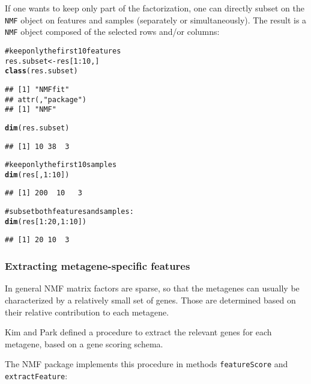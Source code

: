 \documentclass[a4paper]{article}\usepackage{graphicx, color}
\makeatletter
\newcommand{\hlfunctioncall}[1]{\textcolor[rgb]{0.501960784313725,0,0.329411764705882}{\textbf{#1}}}%
\newcommand{\hlcomment}[1]{\textcolor[rgb]{0.180392156862745,0.6,0.341176470588235}{#1}}%
\newenvironment{kframe}{%
 \def\at@end@of@kframe{}%
 \ifinner\ifhmode%
  \def\at@end@of@kframe{\end{minipage}}%
  \begin{minipage}{\columnwidth}%
 \fi\fi%
 \def\FrameCommand##1{\hskip\@totalleftmargin \hskip-\fboxsep
 \colorbox{shadecolor}{##1}\hskip-\fboxsep
     \hskip-\linewidth \hskip-\@totalleftmargin \hskip\columnwidth}%
 \MakeFramed {\advance\hsize-\width
   \@totalleftmargin\z@ \linewidth\hsize
   \@setminipage}}%
 {\par\unskip\endMakeFramed%
 \at@end@of@kframe}
\newenvironment{knitrout}{}{} %
\let\code=\texttt
\renewcommand{\cite}[1]{\parencite{#1}}
\makeatother
\begin{document}
If one wants to keep only part of the factorization, one can directly subset on the \code{NMF} object on features and samples (separately or simultaneously).
The result is a \code{NMF} object composed of the selected rows and/or columns:
\begin{knitrout}
\color{fgcolor}\begin{kframe}
\begin{alltt}
\hlcomment{# keep only the first 10 features}
res.subset <- res[1:10, ]
\hlfunctioncall{class}(res.subset)
\end{alltt}
\begin{verbatim}
## [1] "NMFfit"
## attr(,"package")
## [1] "NMF"
\end{verbatim}
\begin{alltt}
\hlfunctioncall{dim}(res.subset)
\end{alltt}
\begin{verbatim}
## [1] 10 38  3
\end{verbatim}
\begin{alltt}
\hlcomment{# keep only the first 10 samples}
\hlfunctioncall{dim}(res[, 1:10])
\end{alltt}
\begin{verbatim}
## [1] 200  10   3
\end{verbatim}
\begin{alltt}
\hlcomment{# subset both features and samples:}
\hlfunctioncall{dim}(res[1:20, 1:10])
\end{alltt}
\begin{verbatim}
## [1] 20 10  3
\end{verbatim}
\end{kframe}
\end{knitrout}


\subsubsection{Extracting metagene-specific features}

In general NMF matrix factors are sparse, so that the metagenes can usually be characterized by a relatively small set of genes. Those are determined based on 
their relative contribution to each metagene.

Kim and Park \cite{KimH2007} defined a procedure to extract the relevant genes for each metagene, based on a gene scoring schema.

The NMF package implements this procedure in methods \code{featureScore} and \code{extractFeature}:
\end{document}
